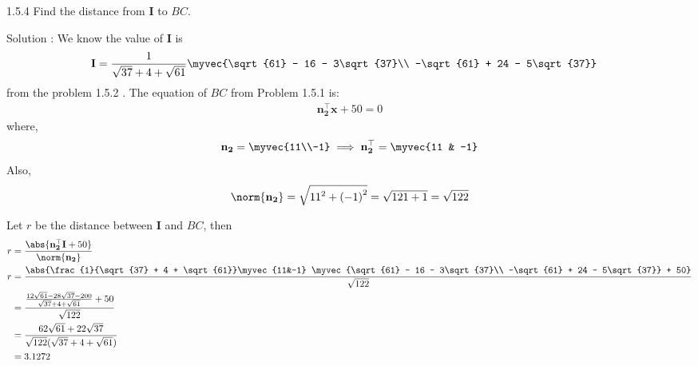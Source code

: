 \documentclass[20pt]{article}
\begin{document}
\let\vec\mathbf


1.5.4 Find the distance from $\vec{I}$ to $BC$.

Solution : 
We know the value of $\vec{I}$ is
\begin{align}
\vec{I} &= \frac{1}{\sqrt{37} + 4 + \sqrt{61}} \myvec{\sqrt{61} - 16 - 3\sqrt{37}\\ -\sqrt{61} + 24 - 5\sqrt{37}}
\end{align}
from the problem 1.5.2 .
The equation of $BC$ from Problem 1.5.1 is:
\begin{align}
\vec{n_2^{\top}}\vec{x}+50=0
\end{align}
where,
\begin{align} 
\vec{n_2} = \myvec{11\\-1}
\implies \vec{n_2^{\top}} = \myvec{11 & -1}
\end{align}
Also,
\begin{align}
\norm{\vec{n_2}} = \sqrt{{11}^2 + {(-1)}^2} = \sqrt{121+1} = \sqrt{122}
\end{align}

Let $r$ be the distance between $\vec{I}$ and $BC$, then
\begin{align}
r &= \frac{\abs{\vec{n_2^{\top}} \vec{I} + 50}}{\norm{\vec{n_2}}} \\
r &= \frac{\abs{\frac{1}{\sqrt{37} + 4 + \sqrt{61}}\myvec{11&-1} \myvec{\sqrt{61} - 16 - 3\sqrt{37}\\ -\sqrt{61} + 24 - 5\sqrt{37}} + 50}}{\sqrt{122}} \\
&= \frac{\frac{12\sqrt{61} - 28\sqrt{37} - 200}{\sqrt{37} + 4 + \sqrt{61}} + 50}{\sqrt{122}} \\
&= \frac{62\sqrt{61} + 22\sqrt{37}}{\sqrt{122} {(\sqrt{37} + 4 + \sqrt{61}})} \\
&= 3.1272                                        
\end{align}
\end{document}
